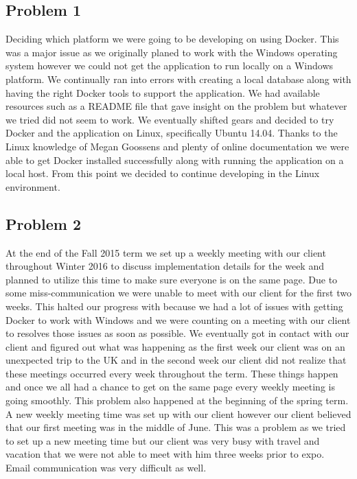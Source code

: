 \documentclass[draftclsnofoot,10pt,onecolumn]{IEEEtran} %
\begin{document}
\subsection{Problem 1}
Deciding which platform we were going to be developing on using Docker. This was
a major issue as we originally planed to work with the Windows operating system
however we could not get the application to run locally on a Windows platform.
We continually ran into errors with creating a local database along with having
the right Docker tools to support the application. We had available resources
such as a README file that gave insight on the problem but whatever we tried did
not seem to work. We eventually shifted gears and decided to try Docker and the
application on Linux, specifically Ubuntu 14.04. Thanks to the Linux knowledge
of Megan Goossens and plenty of online documentation we were able to get Docker
installed successfully along with running the application on a local host. From
this point we decided to continue developing in the Linux environment.

\subsection{Problem 2}
At the end of the Fall 2015 term we set up a weekly meeting with our client
throughout Winter 2016 to discuss implementation details for the week and
planned to utilize this time to make sure everyone is on the same page. Due to
some miss-communication we were unable to meet with our client for the first two
weeks. This halted our progress with because we had a lot of issues with getting
Docker to work with Windows and we were counting on a meeting with our client to
resolves those issues as soon as possible. We eventually got in contact with our
client and figured out what was happening as the first week our client was on an
unexpected trip to the UK and in the second week our client did not realize that
these meetings occurred every week throughout the term. These things happen and
once we all had a chance to get on the same page every weekly meeting is going
smoothly. This problem also happened at the beginning of the spring term. A new
weekly meeting time was set up with our client however our client believed that
our first meeting was in the middle of June. This was a problem as we tried to
set up a new meeting time but our client was very busy with travel and vacation
that we were not able to meet with him three weeks prior to expo. Email communication
was very difficult as well.
\end{document}
